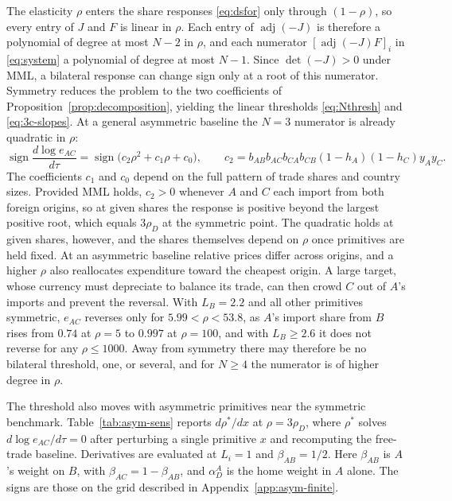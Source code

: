 \documentclass[11pt]{article}
\begin{document}
The elasticity $\rho$ enters the share responses \eqref{eq:dsfor} only through $(1-\rho)$, so every entry of $J$ and $F$ is linear in $\rho$. Each entry of $\operatorname{adj}(-J)$ is therefore a polynomial of degree at most $N-2$ in $\rho$, and each numerator $[\operatorname{adj}(-J)F]_i$ in \eqref{eq:system} a polynomial of degree at most $N-1$. Since $\det(-J)>0$ under MML, a bilateral response can change sign only at a root of this numerator. Symmetry reduces the problem to the two coefficients of Proposition~\ref{prop:decomposition}, yielding the linear thresholds \eqref{eq:Nthresh} and \eqref{eq:3c-slopes}. At a general asymmetric baseline the $N=3$ numerator is already quadratic in $\rho$:
\begin{equation}
\operatorname{sign}\frac{d\log e_{AC}}{d\tau} = \operatorname{sign} \big( c_2\rho^2+c_1\rho+c_0 \big),
\qquad
c_2 = b_{AB}b_{AC}b_{CA}b_{CB} (1-h_A)(1-h_C)y_Ay_C.
\end{equation}
The coefficients $c_1$ and $c_0$ depend on the full pattern of trade shares and country sizes. Provided MML holds, $c_2>0$ whenever $A$ and $C$ each import from both foreign origins, so at given shares the response is positive beyond the largest positive root, which equals $3\rho_D$ at the symmetric point. The quadratic holds at given shares, however, and the shares themselves depend on $\rho$ once primitives are held fixed. At an asymmetric baseline relative prices differ across origins, and a higher $\rho$ also reallocates expenditure toward the cheapest origin. A large target, whose currency must depreciate to balance its trade, can then crowd $C$ out of $A$'s imports and prevent the reversal. With $L_B=2.2$ and all other primitives symmetric, $e_{AC}$ reverses only for $5.99<\rho<53.8$, as $A$'s import share from $B$ rises from $0.74$ at $\rho=5$ to $0.997$ at $\rho=100$, and with $L_B\geq2.6$ it does not reverse for any $\rho\leq1000$. Away from symmetry there may therefore be no bilateral threshold, one, or several, and for $N\geq4$ the numerator is of higher degree in $\rho$.

The threshold also moves with asymmetric primitives near the symmetric benchmark. Table~\ref{tab:asym-sens} reports $d\rho^\ast/dx$ at $\rho=3\rho_D$, where $\rho^\ast$ solves $d\log e_{AC}/d\tau=0$ after perturbing a single primitive $x$ and recomputing the free-trade baseline. Derivatives are evaluated at $L_i=1$ and $\beta_{AB}=1/2$. Here $\beta_{AB}$ is $A$'s weight on $B$, with $\beta_{AC}=1-\beta_{AB}$, and $\alpha_D^A$ is the home weight in $A$ alone. The signs are those on the grid described in Appendix~\ref{app:asym-finite}.
\end{document}
